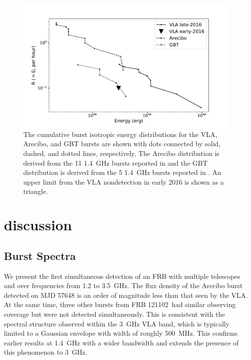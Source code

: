 \documentclass[twocolumn]{aastex61}
\newcommand{\frb}{FRB 121102}
\begin{document}
\begin{figure}[htb]
\begin{center}
\includegraphics[width=\columnwidth]{energy_disn.pdf}
\caption{The cumulative burst isotropic energy distributions for the VLA, Arecibo, and GBT bursts are shown with dots connected by solid, dashed, and dotted lines, respectively. The Arecibo distribution is derived from the 11 1.4~GHz bursts reported in \citet{2016Natur.531..202S} and the GBT distribution is derived from the 5 1.4~GHz bursts reported in \citet{2016arXiv160308880S}. An upper limit from the VLA nondetection in early 2016 is shown as a triangle. \label{fig:ed}}
\end{center}
\end{figure}

\section{discussion}
\label{sec:disc}
\subsection{Burst Spectra}

We present the first simultaneous detection of an FRB with multiple telescopes and over frequencies from 1.2 to 3.5~GHz. The flux density of the Arecibo burst detected on MJD 57648 is an order of magnitude less than that seen by the VLA. At the same time, three other bursts from \frb\ had similar observing coverage but were not detected simultaneously. This is consistent with the spectral structure observed within the 3~GHz VLA band, which is typically limited to a Gaussian envelope with width of roughly 500~MHz. This confirms earlier results at 1.4~GHz \citep{2016Natur.531..202S, 2016arXiv160308880S} with a wider bandwidth and extends the presence of this phenomenon to 3~GHz.
\end{document}

